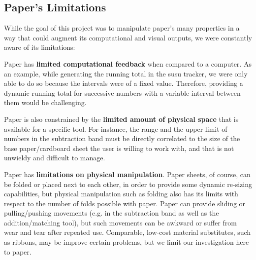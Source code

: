 \documentclass{sig-alternate}
\begin{document}


\label{sec:constraints}
\subsection {Paper's Limitations}

While the goal of this project was to manipulate paper's many properties in a way that could augment its computational and visual outputs, we were constantly aware of its limitations:
\begin{compactitem}
  \item Paper has {\bf limited computational feedback} when compared to a computer. As an example, while generating the running total in the susu tracker, we were only able to do so because the intervals were of a fixed value. Therefore, providing a dynamic running total for successive numbers with a variable interval between them would be challenging. 
  \item Paper is also constrained by the {\bf limited amount of physical space} that is available for a specific tool. For instance, the range and the upper limit of numbers in the subtraction band must be directly correlated to the size of the base paper/cardboard sheet the user is willing to work with, and that is not unwieldy and difficult to manage.
  \item Paper has {\bf limitations on physical manipulation}. Paper sheets, of course, can be folded or placed next to each other, in order to provide some dynamic re-sizing capabilities, but physical manipulation such as folding also has its limits with respect to the number of folds possible with paper. Paper can provide sliding or pulling/pushing movements (e.g. in the subtraction band as well as the addition/matching tool), but such movements can be awkward or suffer from wear and tear after repeated use. Comparable, low-cost material substitutes, such as ribbons, may be improve certain problems, but we limit our investigation here to paper.
\end{compactitem}
\end{document}
